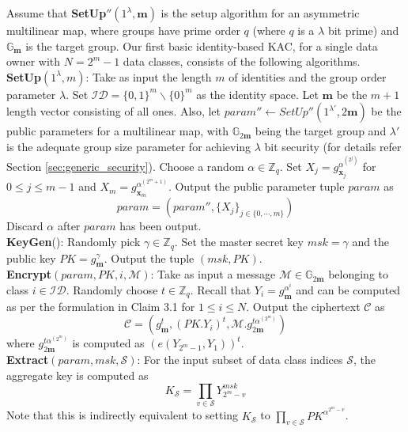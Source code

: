 Assume that \textbf{SetUp}$''(1^{\lambda},\mathbf{m})$ is the setup algorithm for an asymmetric multilinear map, where groups have prime order $q$ (where $q$ is a $\lambda$ bit prime) and $\mathbb{G}_{\mathbf{m}}$ is the target group. Our first basic identity-based KAC, for a single data owner with $N=2^m-1$ data classes, consists of the following algorithms.\\

\noindent\textbf{SetUp}$(1^{\lambda},m)$: Take as input the length $m$ of identities and the group order parameter $\lambda$. Set $\mathcal{ID}=\{0,1\}^m\backslash\{0\}^m$ as the identity space. Let $\mathbf{m}$ be the $m+1$ length vector consisting of all ones. Also, let $param''\leftarrow SetUp''(1^{\lambda'},2\mathbf{m})$ be the public parameters for a multilinear map, with $\mathbb{G}_{2\mathbf{m}}$ being the target group and $\lambda'$ is the adequate group size parameter for achieving $\lambda$ bit security (for details refer Section \ref{sec:generic_security}). Choose a random $\alpha\in \mathbb{Z}_q$. Set $X_j=g^{\alpha^{(2^j)}}_{\mathbf{x}_j}$ for $0\leq j\leq m-1$ and $X_m=g^{\alpha^{(2^m+1)}}_{\mathbf{x}_m}$. Output the public parameter tuple $param$ as
\begin{equation}
 param = (param'',\{X_j\}_{j\in\{0,\cdots,m\}})\nonumber
\end{equation}
\noindent Discard $\alpha$ after $param$ has been output.\\

\noindent \textbf{KeyGen}(): Randomly pick $\gamma\in \mathbb{Z}_q$. Set the master secret key $msk=\gamma$ and the public key $PK=g^{\gamma}_{\mathbf{m}}$. Output the tuple $(msk,PK)$.\\

\noindent \textbf{Encrypt}$(param,PK,i,\mathcal{M})$: Take as input a message $\mathcal{M} \in \mathbb{G}_{2\mathbf{m}}$ belonging to class $i \in \mathcal{ID}$. Randomly choose $t\in\mathbb{Z}_q$. Recall that $Y_i=g^{\alpha^i}_{\mathbf{m}}$ and can be computed as per the formulation in Claim 3.1 for $1\leq i\leq N$. Output the ciphertext $\mathcal{C}$ as 
\begin{equation}
 \mathcal{C}=\left(g^{t}_{\mathbf{m}},(PK.Y_i)^{t},\mathcal{M}.g^{t\alpha^{(2^m)}}_{2\mathbf{m}}\right)\nonumber
\end{equation}
\noindent where $g^{t\alpha^{(2^m)}}_{2\mathbf{m}}$ is computed as $\left(e(Y_{2^m-1},Y_1)\right)^{t}$.\\

\noindent \textbf{Extract}$(param,msk,\mathcal{S})$: For the input subset of data class indices $\mathcal{S}$, the aggregate key is computed as 
\begin{equation}
 K_{\mathcal{S}} = \prod_{v\in\mathcal{S}}Y^{msk}_{2^m-v}\nonumber
\end{equation} 
\noindent Note that this is indirectly equivalent to setting $K_{\mathcal{S}}$ to $\prod_{v\in\mathcal{S}}PK^{\alpha^{2^m-v}}$.\\
 
